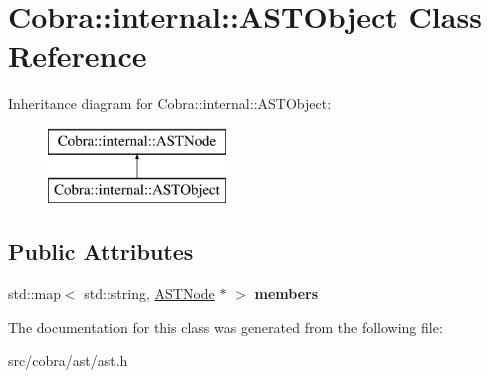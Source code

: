 \hypertarget{class_cobra_1_1internal_1_1_a_s_t_object}{\section{Cobra\+:\+:internal\+:\+:A\+S\+T\+Object Class Reference}
\label{class_cobra_1_1internal_1_1_a_s_t_object}
}
Inheritance diagram for Cobra\+:\+:internal\+:\+:A\+S\+T\+Object\+:\begin{figure}[H]
\begin{center}
\leavevmode
\includegraphics[height=2.000000cm]{class_cobra_1_1internal_1_1_a_s_t_object}
\end{center}
\end{figure}
\subsection*{Public Attributes}
\begin{DoxyCompactItemize}
\item 
\hypertarget{class_cobra_1_1internal_1_1_a_s_t_object_ad6a21e13650d502c0fcb35aa8b14f20a}{std\+::map$<$ std\+::string, \hyperlink{class_cobra_1_1internal_1_1_a_s_t_node}{A\+S\+T\+Node} $\ast$ $>$ {\bfseries members}}\label{class_cobra_1_1internal_1_1_a_s_t_object_ad6a21e13650d502c0fcb35aa8b14f20a}

\end{DoxyCompactItemize}


The documentation for this class was generated from the following file\+:\begin{DoxyCompactItemize}
\item 
src/cobra/ast/ast.\+h\end{DoxyCompactItemize}
